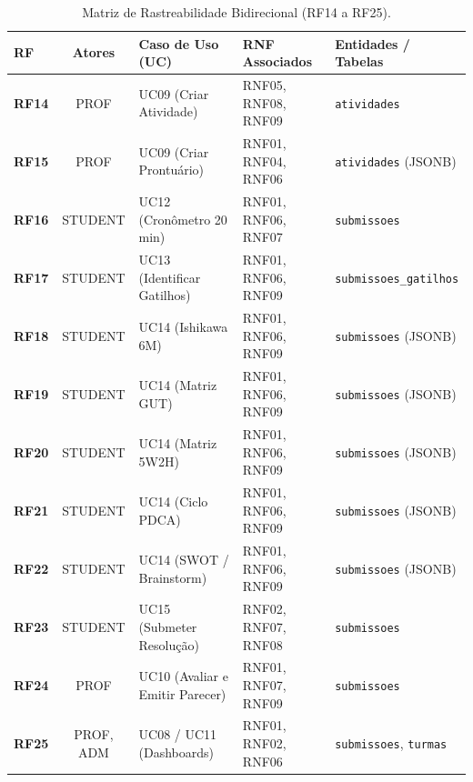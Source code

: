 \begin{table}[htb]
\centering
\small
\caption{Matriz de Rastreabilidade Bidirecional (RF14 a RF25).}
\label{tab_matriz_rastreabilidade_2}
\begin{tabularx}{\textwidth}{l c >{\raggedright\arraybackslash}p{3.5cm} >{\raggedright\arraybackslash}X >{\raggedright\arraybackslash}p{3.8cm}}
\toprule
\textbf{RF} & \textbf{Atores} & \textbf{Caso de Uso (UC)} & \textbf{RNF Associados} & \textbf{Entidades / Tabelas} \\
\midrule
\textbf{RF14} & PROF & UC09 (Criar Atividade) & RNF05, RNF08, RNF09 & \texttt{atividades} \\
\midrule
\textbf{RF15} & PROF & UC09 (Criar Prontuário) & RNF01, RNF04, RNF06 & \texttt{atividades} (JSONB) \\
\midrule
\textbf{RF16} & STUDENT & UC12 (Cronômetro 20 min) & RNF01, RNF06, RNF07 & \texttt{submissoes} \\
\midrule
\textbf{RF17} & STUDENT & UC13 (Identificar Gatilhos) & RNF01, RNF06, RNF09 & \texttt{submissoes\_gatilhos} \\
\midrule
\textbf{RF18} & STUDENT & UC14 (Ishikawa 6M) & RNF01, RNF06, RNF09 & \texttt{submissoes} (JSONB) \\
\midrule
\textbf{RF19} & STUDENT & UC14 (Matriz GUT) & RNF01, RNF06, RNF09 & \texttt{submissoes} (JSONB) \\
\midrule
\textbf{RF20} & STUDENT & UC14 (Matriz 5W2H) & RNF01, RNF06, RNF09 & \texttt{submissoes} (JSONB) \\
\midrule
\textbf{RF21} & STUDENT & UC14 (Ciclo PDCA) & RNF01, RNF06, RNF09 & \texttt{submissoes} (JSONB) \\
\midrule
\textbf{RF22} & STUDENT & UC14 (SWOT / Brainstorm) & RNF01, RNF06, RNF09 & \texttt{submissoes} (JSONB) \\
\midrule
\textbf{RF23} & STUDENT & UC15 (Submeter Resolução) & RNF02, RNF07, RNF08 & \texttt{submissoes} \\
\midrule
\textbf{RF24} & PROF & UC10 (Avaliar e Emitir Parecer) & RNF01, RNF07, RNF09 & \texttt{submissoes} \\
\midrule
\textbf{RF25} & PROF, ADM & UC08 / UC11 (Dashboards) & RNF01, RNF02, RNF06 & \texttt{submissoes}, \texttt{turmas} \\
\bottomrule
\end{tabularx}
\end{table}

